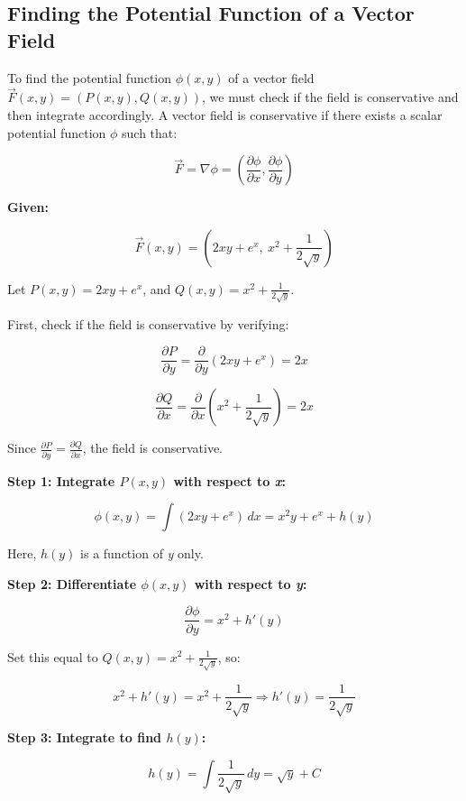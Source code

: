 \subsection{Finding the Potential Function of a Vector Field}

To find the potential function \( \phi(x, y) \) of a vector field \( \vec{F}(x, y) = (P(x, y), Q(x, y)) \), 
we must check if the field is conservative and then integrate accordingly. A vector field is conservative 
if there exists a scalar potential function \( \phi \) such that:

\[
    \vec{F} = \nabla \phi = \left( \frac{\partial \phi}{\partial x}, \frac{\partial \phi}{\partial y} 
    \right)
\]

\textbf{Given:}

\[
    \vec{F}(x, y) = \left(2xy + e^x,\ x^2 + \frac{1}{2\sqrt{y}}\right)
\]

Let \( P(x, y) = 2xy + e^x \), and \( Q(x, y) = x^2 + \frac{1}{2\sqrt{y}} \).

First, check if the field is conservative by verifying:

\[
    \frac{\partial P}{\partial y} = \frac{\partial}{\partial y}(2xy + e^x) = 2x
\]

\[
    \frac{\partial Q}{\partial x} = \frac{\partial}{\partial x}\left(x^2 + \frac{1}{2\sqrt{y}}\right) 
    = 2x
\]

Since \( \frac{\partial P}{\partial y} = \frac{\partial Q}{\partial x} \), the field is conservative.
\vspace{\baselineskip}

\textbf{Step 1: Integrate \( P(x, y) \) with respect to \emph{x}:}

\[
    \phi(x, y) = \int (2xy + e^x)\,dx = x^2y + e^x + h(y)
\]

Here, \( h(y) \) is a function of \emph{y} only.
\vspace{\baselineskip}

\textbf{Step 2: Differentiate \( \phi(x, y) \) with respect to \emph{y}:}

\[
    \frac{\partial \phi}{\partial y} = x^2 + h'(y)
\]

Set this equal to \( Q(x, y) = x^2 + \frac{1}{2\sqrt{y}} \), so:

\[
    x^2 + h'(y) = x^2 + \frac{1}{2\sqrt{y}} \Rightarrow h'(y) = \frac{1}{2\sqrt{y}}
\]

\textbf{Step 3: Integrate to find \( h(y) \):}

\[
    h(y) = \int \frac{1}{2\sqrt{y}}\,dy = \sqrt{y} + C
\]

